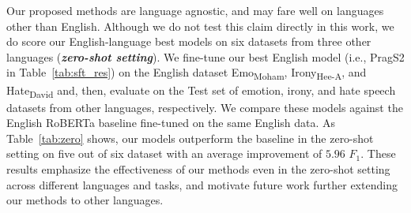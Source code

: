 

Our proposed methods are language agnostic, and may fare well on languages other than English. Although we do not test this claim directly in this work, we do score our English-language best models on six datasets from three other languages (\textit{\textbf{zero-shot setting}}). %
We fine-tune our best English model (i.e., PragS2 in Table~\ref{tab:sft_res}) on the English dataset Emo\textsubscript{Moham}, Irony\textsubscript{Hee-A}, and Hate\textsubscript{David} and, then, evaluate on the Test set of emotion, irony, and hate speech datasets from other languages, respectively. We compare these models against the English RoBERTa baseline fine-tuned on the same English data. As Table~\ref{tab:zero} shows, our models outperform the baseline in the zero-shot setting on five out of six dataset with an average improvement of $5.96$ $F_1$. These results emphasize the effectiveness of our methods even in the zero-shot setting across different languages and tasks, and motivate future work further extending our methods to other languages.

